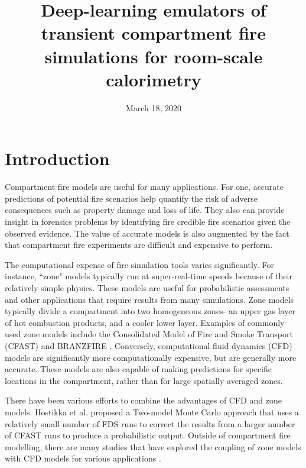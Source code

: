 \documentclass{article}
\begin{document}
\title{Deep-learning emulators of transient compartment fire simulations for room-scale calorimetry}




\author{}
\date{March 18, 2020} 

\maketitle

\begin{abstract}

\end{abstract}
\section{Introduction}
Compartment fire models are useful for many applications. For one, accurate predictions of potential fire scenarios help quantify the risk of adverse consequences such as property damage and loss of life. They also can provide insight in forensics problems by identifying fire credible fire scenarios given the observed evidence. The value of accurate models is also augmented by the fact that compartment fire experiments are difficult and expensive to perform. 

The computational expense of fire simulation tools varies significantly. For instance,  ``zone" models typically run at super-real-time speeds because of their relatively simple physics. These models are useful for probabilistic assessments \cite{anderson2018quantifying, baker2013developing} and other applications that require results from many simulations. Zone models typically divide a compartment into two homogeneous zones- an upper gas layer of hot combustion products, and a cooler lower layer. Examples of commonly used zone models include the Consolidated Model of Fire and Smoke Transport (CFAST) \cite{peacock1993cfast} and BRANZFIRE \cite{wade2000branzfire}. Conversely, computational fluid dynamics (CFD) models are significantly more computationally expensive, but are generally more accurate. These models are also capable of making predictions for specific locations in the compartment, rather than for large spatially averaged zones. 

There have been various efforts to combine the advantages of CFD and zone models. Hostikka et al. \cite{hostikka2005two} proposed a Two-model Monte Carlo approach that uses a relatively small number of FDS runs to correct the results from a larger number of CFAST runs to produce a probabilistic output. Outside of compartment fire modelling, there are many studies that have explored the coupling of zone models with CFD models for various applications \cite{dreng2008method, tan2005application, wang2007validation, colella2009calculation, floyd2011coupling, colella2011multiscale}. 
\end{document}
